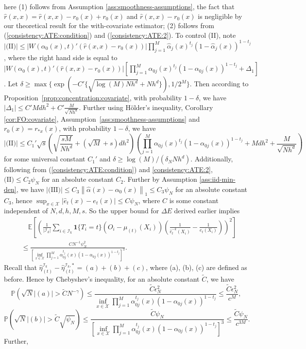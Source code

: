 \documentclass[11pt]{article}
\newcommand{\norm}[1]{\left\lVert #1 \right\rVert}
\begin{document}
here (1) follows from Assumption \ref{ass:smoothness-assumptions}, the fact that $\hat{r}(x,x)=\hat{r}(x,x)-r_0(x)+r_0(x)$ and $\hat{r}(x,x)-r_0(x)$ is negligible by our theoretical result for the with-covariate estimator; (2) follows from (\ref{consistency:ATE:condition}) and (\ref{consistency:ATE:2}). To control (II), note $|\textrm{(II)}|\leq |W(\alpha_0(x),t)'(\hat{r}(x,x)-r_0(x))|\prod_{j=1}^M\hat\alpha_j(x)^{t_j}(1-\hat\alpha_j(x))^{1-t_j}$, where the right hand side is equal to $|W(\alpha_0(x),t)'(\hat{r}(x,x)-r_0(x))|\left[\prod_{j=1}^M\alpha_{0j}(x)^{t_j}(1-\alpha_{0j}(x))^{1-t_j}+\Delta_1\right]$. Let $\delta\geq\max\{\exp(-C'\{\sqrt{\log(M)Nh^d}+Nh^d\}),1/2^M\}$. Then according to Proposition~\ref{prop:concentration:covariate}, with probability $1-\delta$, we have $|\Delta_1|\leq C'Mdh^2+C'\frac{M}{\sqrt{Nh^d}}$. Further using H\"older's inequality, Corollary \ref{cor:FO:covariate}, Assumption~\ref{ass:smoothness-assumptions} and $r_0(x)=r_{*x}(x)$, with probability $1-\delta$, we have 
$$|\textrm{(II)}|\leq C_1'\sqrt{s}\left(\!\!\sqrt{\frac{sM}{Nh^d}}+(\sqrt{M}+s)dh^2\right)\!\left(\prod_{j=1}^M\alpha_{0j}(x)^{t_j}(1-\alpha_{0j}(x))^{1-t_j}\!+\!Mdh^2\!+\!\frac{M}{\sqrt{Nh^d}}\right)$$ for some universal constant $C_1'$ and $\delta\geq\log(M)/(\delta_NNh^d)$. Additionally, following from (\ref{consistency:ATE:condition}) and \eqref{consistency:ATE:2}, $\textrm{(II)}\leq C_2\psi_N$ for an absolute constant $C_2$. Further by Assumption \ref{ass:iid-min-den}, we have $|\textrm{(III)}|\leq C_3\norm{\hat{\alpha}(x)-\alpha_0(x)}_1\leq C_3\psi_N$ for an absolute constant $C_3$, hence $\displaystyle\sup_{x\in\mathcal{X}}|\hat{e}_t(x)-e_t(x)|\leq C\psi_N$, where $C$ is some constant independent of $N,d,h,M,s$. So the upper bound for $\Delta E$ derived earlier implies $$\begin{array}{rl}
&\quad\displaystyle\mathbb{E}\left[\left(\frac{1}{|\mathcal{I}_k|}\sum_{i\in\mathcal{I}_k}\mathbf{1}\{T_i=t\}(O_i-\mu_{(t)}(X_i))\left(\frac{1}{\hat{e}_t^{-k}(X_i)}-\frac{1}{e_t(X_i)}\right)\right)^2\right]\\
&\displaystyle\leq\frac{CN^{-1}\psi_N^2}{[\inf_{x\in\mathcal{X}}\prod_{j=1}^M \alpha_{0j}^{t_j}(x)(1-\alpha_{0j}(x))^{1-t_j}]^3}.
\end{array}$$ 
Recall that $\hat{\eta}_{(t)}^{\mathcal{I}_k}-\hat{\eta}_{(t)}^{\mathcal{I}_k,*}=(a)+(b)+(c)$, where (a), (b), (c) are defined as before. Hence by Chebyshev's inequality, for an absolute constant $\tilde{C}$, we have 
$$\mathbb{P}(\sqrt{N}|(a)|>\tilde{C} N^{-\gamma})\leq\frac{\tilde{C}\epsilon_N^2}{\inf_{x\in\mathcal{X}}\prod_{j=1}^M \alpha_{0j}^{t_j}(x)(1-\alpha_{0j}(x))^{1-t_j}}\leq\frac{\tilde{C}\epsilon_N^2}{c^M},$$ $$\mathbb{P}(\sqrt{N}|(b)|>\tilde{C}\sqrt{\psi_N})\leq\frac{\tilde{C}\psi_N}{[\inf_{x\in\mathcal{X}}\prod_{j=1}^M \alpha_{0j}^{t_j}(x)(1-\alpha_{0j}(x))^{1-t_j}]^3}\leq\frac{\tilde{C}\psi_N}{c^{3M}}.$$ Further, 
\end{document}
